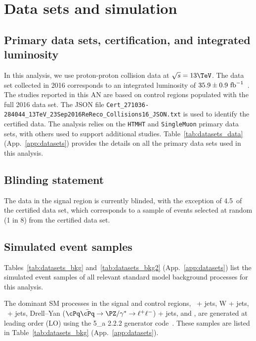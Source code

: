 \section{Data sets and simulation}
\label{sec:datasets}

\subsection{Primary data sets, certification, and integrated luminosity}

In this analysis, we use proton-proton collision data at $\sqrt{s} =
13\TeV$. The data set collected in 2016 corresponds to an integrated
luminosity of $35.9 \pm 0.9~\text{fb}^{-1}$~\cite{lumi}. The studies reported in
this AN are based on control regions populated with the full 2016 data
set. The JSON file
\verb!Cert_271036-284044_13TeV_23Sep2016ReReco_Collisions16_JSON.txt!
is used to identify the certified data. The analysis relies on the
\verb!HTMHT! and \verb!SingleMuon! primary data sets, with others used
to support additional studies. Table~\ref{tab:datasets_data}
(App.~\ref{app:datasets}) provides the details on all the primary data
sets used in this analysis.

\subsection{Blinding statement}

The data in the signal region is currently blinded, with the exception
of 4.5~\ifb of the certified data set, which corresponds to a sample
of events selected at random (1 in 8) from the certified data set.

\subsection{Simulated event samples}

Tables~\ref{tab:datasets_bkg} and~\ref{tab:datasets_bkg2}
(App.~\ref{app:datasets}) list the simulated event samples of all
relevant standard model background processes for this analysis.

The dominant SM processes in the signal and control regions, \znunu\ +
jets, W + jets, \ttbar\ + jets, Drell--Yan ($\cPq\bar{\cPq} \to
\PZ/\gamma^* \to \ell^+\ell^-$) + jets, and \gj, are generated at
leading order (LO) using the {\MADGRAPH{}5\_a\MCATNLO} 2.2.2 generator
code~\cite{madgraph}. These samples are listed in
Table~\ref{tab:datasets_bkg} (App.~\ref{app:datasets}).

